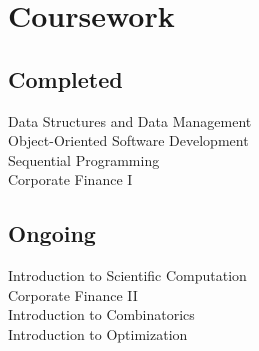 \documentclass[letterpaper]{deedy-resume} %
\begin{document}
\begin{minipage}[t]{0.32\textwidth}

\section{Coursework}

\subsection{Completed}
Data Structures and Data Management\\
{\fontsize{9.75}{11}\selectfont Object-Oriented Software Development}\\
Sequential Programming\\
Corporate Finance I\\ 

\sectionspace %

\subsection{Ongoing}
Introduction to Scientific Computation\\
Corporate Finance II\\
Introduction to Combinatorics\\
Introduction to Optimization\\ 


\sectionspace %

\end{minipage} %
\hfill
%
%
\end{document}
